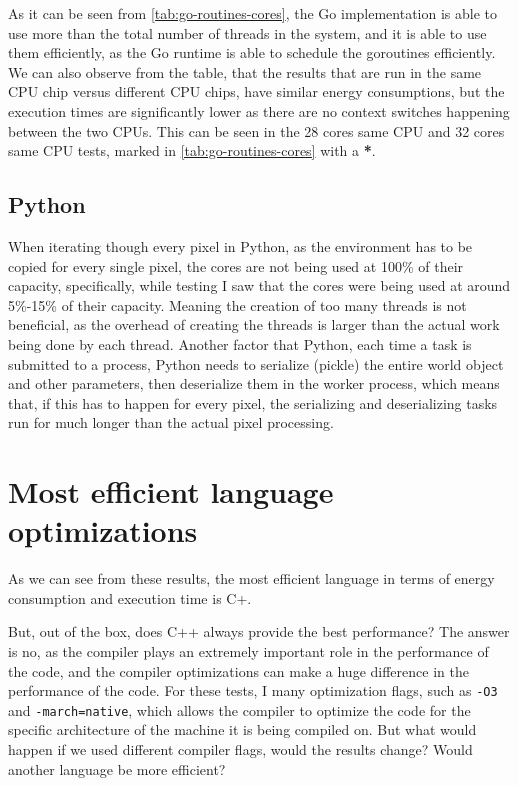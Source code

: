 

As it can be seen from \autoref{tab:go-routines-cores}, the Go implementation is able to use more than the total number of threads in the system, and it is able to use them efficiently, as the Go runtime is able to schedule the goroutines efficiently. We can also observe from the table, that the results that are run in the same CPU chip versus different CPU chips, have similar energy consumptions, but the execution times are significantly lower as there are no context switches happening between the two CPUs. This can be seen in the 28 cores same CPU and 32 cores same CPU tests, marked in \autoref{tab:go-routines-cores} with a \textbf{*}.

\subsection{Python}
When iterating though every pixel in Python, as the environment has to be copied for every single pixel, the cores are not being used at 100\% of their capacity, specifically, while testing I saw that the cores were being used at around 5\%-15\% of their capacity. Meaning the creation of too many threads is not beneficial, as the overhead of creating the threads is larger than the actual work being done by each thread. 
Another factor that Python, each time a task is submitted to a process, Python needs to serialize (pickle) the entire world object and other parameters, then deserialize them in the worker process, which means that, if this has to happen for every pixel, the serializing and deserializing tasks run for much longer than the actual pixel processing.

\section{Most efficient language optimizations}
As we can see from these results, the most efficient language in terms of energy consumption and execution time is C\++. 

But, out of the box, does C++ always provide the best performance? The answer is no, as the compiler plays an extremely important role in the performance of the code, and the compiler optimizations can make a huge difference in the performance of the code.
For these tests, I many optimization flags, such as \texttt{-O3} and \texttt{-march=native}, which allows the compiler to optimize the code for the specific architecture of the machine it is being compiled on. But what would happen if we used different compiler flags, would the results change? Would another language be more efficient?

